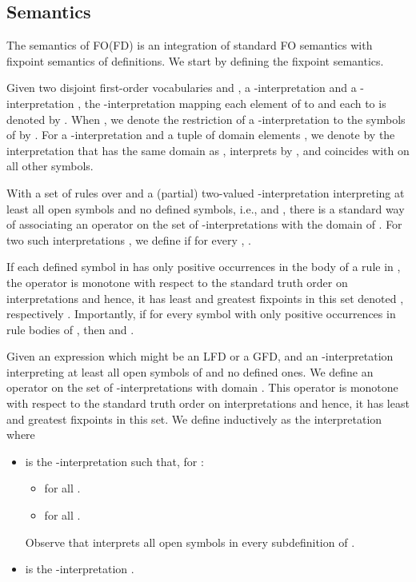 \documentclass{tlp}
\begin{document}
\subsection{Semantics}


The semantics of FO(FD) is an integration of standard FO semantics with fixpoint semantics of definitions. We start by defining the fixpoint semantics.

Given two disjoint first-order vocabularies  and , a -interpretation  and a -interpretation , the -interpretation mapping each element  of  to  and each  to  is denoted by . When , we denote the restriction of a -interpretation  to the symbols of  by . For a -interpretation  and a tuple of domain elements , we denote by  the interpretation that has the same domain as , interprets  by , and coincides with  on all other symbols.

With a set  of rules over  and a (partial) two-valued -interpretation  interpreting at least all open symbols and no defined symbols, i.e.,  and , there is a standard way of associating an operator  on the set of -interpretations with the domain of . For two such interpretations , we define  if for every , .

If each defined symbol in  has only positive occurrences in the body of a rule in , the operator  is monotone with respect to the standard truth order on interpretations and hence, it has least and greatest fixpoints in this set denoted , respectively . Importantly, if  for every symbol  with only positive occurrences in rule bodies of , then  and .

Given an expression  which might be an LFD or a GFD, and an -interpretation  interpreting at least all open symbols of  and no defined ones. We define an operator  on the set of -interpretations with domain . This operator is monotone with respect to the standard truth order on interpretations and hence, it has least and greatest fixpoints in this set. We define  inductively as the interpretation  where
\begin{itemize}
\item  is the -interpretation
  such that, for :
  \begin{itemize}
  \item   for all .
  \item  for all .
\end{itemize}
Observe that  interprets all open symbols in every
subdefinition of .
\item  is the -interpretation .
\end{itemize}
\end{document}
